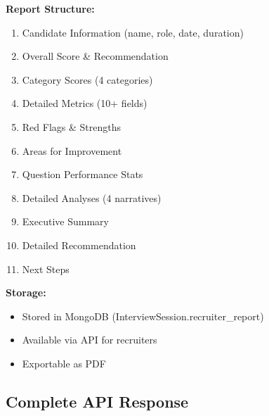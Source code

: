 \documentclass[12pt,a4paper]{article}
\begin{document}
\begin{tcolorbox}[colback=successgreen!5,colframe=successgreen,title=\textbf{STEP 10: Generate Complete Recruiter Report}]

\textbf{Report Structure:}
\begin{enumerate}
    \item Candidate Information (name, role, date, duration)
    \item Overall Score \& Recommendation
    \item Category Scores (4 categories)
    \item Detailed Metrics (10+ fields)
    \item Red Flags \& Strengths
    \item Areas for Improvement
    \item Question Performance Stats
    \item Detailed Analyses (4 narratives)
    \item Executive Summary
    \item Detailed Recommendation
    \item Next Steps
\end{enumerate}

\textbf{Storage:}
\begin{itemize}
    \item Stored in MongoDB (InterviewSession.recruiter\_report)
    \item Available via API for recruiters
    \item Exportable as PDF
\end{itemize}

\end{tcolorbox}

\newpage

\subsection{Complete API Response}
\end{document}
